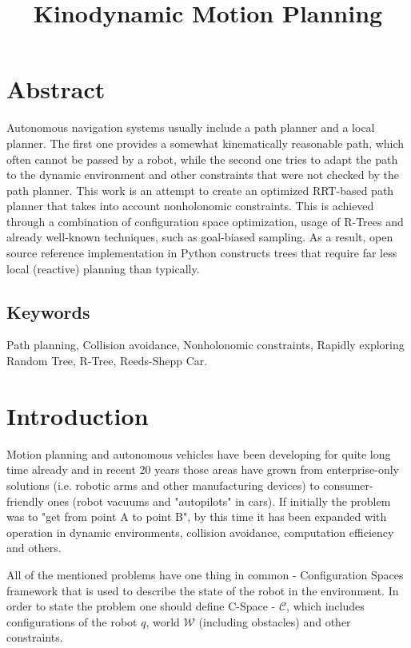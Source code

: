 \documentclass[12pt]{article}
\title{Kinodynamic Motion Planning}
\author{}
\DeclareRobustCommand{\[}{\begin{equation}}
\DeclareRobustCommand{\]}{\end{equation}}
\numberwithin{equation}{section}
\begin{document}
\maketitle

\section{Abstract}

Autonomous navigation systems usually include a path planner and a local planner.
The first one provides a somewhat kinematically reasonable path, which often cannot be passed by a robot,
while the second one tries to adapt the path to the dynamic environment and other constraints that were not checked by the path planner.
This work is an attempt to create an optimized RRT-based path planner that takes into account nonholonomic constraints.
This is achieved through a combination of configuration space optimization, usage of R-Trees and already well-known techniques, such as goal-biased sampling. As a result, open source reference implementation in Python constructs trees that require far less local (reactive) planning than typically.
\subsection{Keywords}{}{}\hfill

Path planning, Collision avoidance, Nonholonomic constraints, Rapidly exploring Random Tree, R-Tree, Reeds-Shepp Car.

\section{Introduction}

Motion planning and autonomous vehicles have been developing for quite long time already and in recent 20 years those areas have grown
from enterprise-only solutions (i.e. robotic arms and other manufacturing devices) to consumer-friendly ones (robot vacuums and "autopilots" in cars).
If initially the problem was to "get from point A to point B", by this time it has been expanded with operation in dynamic environments, collision avoidance, computation efficiency and others.

All of the mentioned problems have one thing in common - Configuration Spaces framework that is used to describe the
state of the robot in the environment. In order to state the problem one should define C-Space - $\mathcal{C}$, which includes configurations of the robot $q$, world $\mathcal{W}$ (including obstacles) and other constraints.
\end{document}
